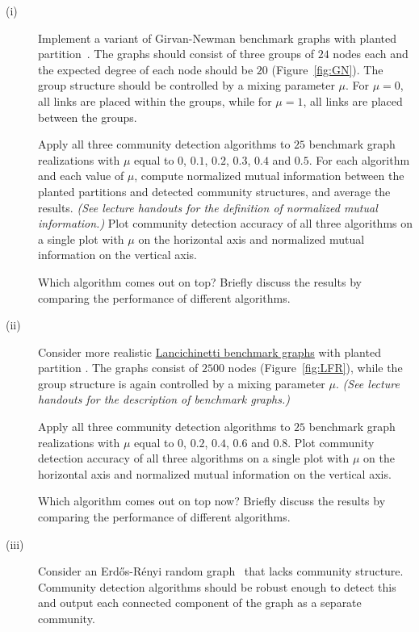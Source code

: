 \documentclass[11pt,a4paper]{article}
\newcommand{\hint}[1]{{\it (#1)}}
\newcommand{\figref}[1]{{\color{LimeGreen}Figure~\ref{fig:#1}}}
\begin{document}
\begin{description}
	\item[(i)] Implement a variant of Girvan-Newman benchmark graphs with planted partition~\cite{GN02}. The graphs should consist of three groups of $24$ nodes each and the expected degree of each node should be $20$ (\figref{GN}). The group structure should be controlled by a mixing parameter $\mu$. For $\mu=0$, all links are placed within the groups, while for $\mu=1$, all links are placed between the groups. 
	
	Apply all three community detection algorithms to $25$ benchmark graph realizations with $\mu$ equal to $0$, $0.1$, $0.2$, $0.3$, $0.4$ and $0.5$. For each algorithm and each value of $\mu$, compute normalized mutual information between the planted partitions and detected community structures, and average the results. \hint{See lecture handouts for the definition of normalized mutual information.} Plot community detection accuracy of all three algorithms on a single plot with $\mu$ on the horizontal axis and normalized mutual information on the vertical axis. 
	
	Which algorithm comes out on top? Briefly discuss the results by comparing the performance of different algorithms.
	
	\item[(ii)] Consider more realistic \href{http://lovro.lpt.fri.uni-lj.si/ina/nets/LFR.zip}{Lancichinetti benchmark graphs} with planted partition \cite{LFR08}. The graphs consist of $2500$ nodes (\figref{LFR}), while the group structure is again controlled by a mixing parameter $\mu$. \hint{See lecture handouts for the description of benchmark graphs.}
	
	Apply all three community detection algorithms to $25$ benchmark graph realizations with $\mu$ equal to $0$, $0.2$, $0.4$, $0.6$ and $0.8$. Plot community detection accuracy of all three algorithms on a single plot with $\mu$ on the horizontal axis and normalized mutual information on the vertical axis. 
	
	Which algorithm comes out on top now? Briefly discuss the results by comparing the performance of different algorithms.
	
	\item[(iii)] Consider an Erd\H{o}s-R\'{e}nyi random graph~\cite{ER59} that lacks community structure. Community detection algorithms should be robust enough to detect this and output each connected component of the graph as a separate community. 
	

\end{description}
\end{document}
